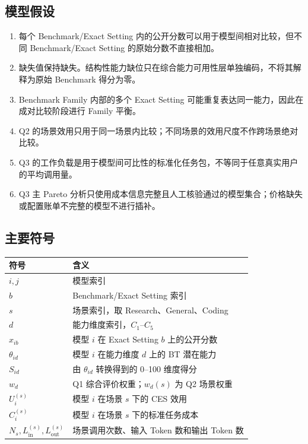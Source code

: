 \subsection{模型假设}
\begin{enumerate}[label=(\arabic*),leftmargin=2.5em]
\item 每个 Benchmark/Exact Setting 内的公开分数可以用于模型间相对比较，但不同 Benchmark/Exact Setting 的原始分数不直接相加。
\item 缺失值保持缺失。结构性能力缺位只在综合能力可用性层单独编码，不将其解释为原始 Benchmark 得分为零。
\item Benchmark Family 内部的多个 Exact Setting 可能重复表达同一能力，因此在成对比较阶段进行 Family 平衡。
\item Q2 的场景效用只用于同一场景内比较；不同场景的效用尺度不作跨场景绝对比较。
\item Q3 的工作负载是用于模型间可比性的标准化任务包，不等同于任意真实用户的平均调用量。
\item Q3 主 Pareto 分析只使用成本信息完整且人工核验通过的模型集合；价格缺失或配置账单不完整的模型不进行插补。
\end{enumerate}

\subsection{主要符号}
\begin{center}
\small
\begin{tabularx}{0.94\textwidth}{>{\raggedright\arraybackslash}p{}Y}
\toprule
符号 & 含义\\
\midrule
$i,j$ & 模型索引\\
$b$ & Benchmark/Exact Setting 索引\\
$s$ & 场景索引，取 Research、General、Coding\\
$d$ & 能力维度索引，$C_1$--$C_5$\\
$x_{ib}$ & 模型 $i$ 在 Exact Setting $b$ 上的公开分数\\
$\theta_{id}$ & 模型 $i$ 在能力维度 $d$ 上的 BT 潜在能力\\
$S_{id}$ & 由 $\theta_{id}$ 转换得到的 0--100 维度得分\\
$w_d$ & Q1 综合评价权重；$w_d(s)$ 为 Q2 场景权重\\
$U_i^{(s)}$ & 模型 $i$ 在场景 $s$ 下的 CES 效用\\
$C_i^{(s)}$ & 模型 $i$ 在场景 $s$ 下的标准任务成本\\
$N_s,L_{\mathrm{in}}^{(s)},L_{\mathrm{out}}^{(s)}$ & 场景调用次数、输入 Token 数和输出 Token 数\\
\bottomrule
\end{tabularx}
\end{center}
